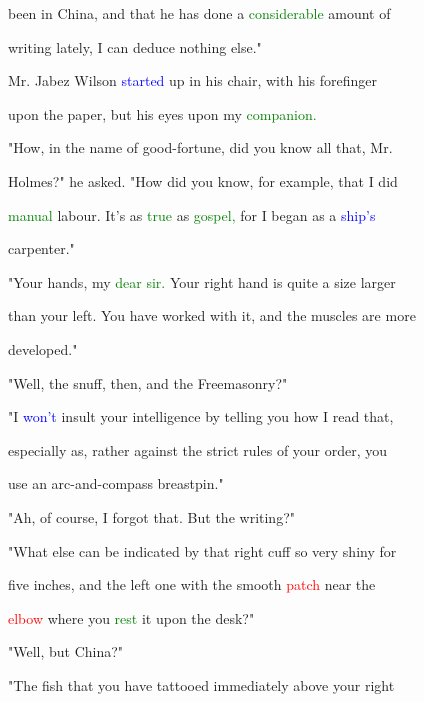  been in China, and that he has done a \textcolor{green}{considerable} amount of

 writing lately, I can deduce nothing else."



 Mr. Jabez Wilson \textcolor{blue}{started} up in his chair, with his forefinger

 upon the paper, but his eyes upon my \textcolor{green}{companion.}



 "How, in the name of good-fortune, did you know all that, Mr.

 Holmes?" he asked. "How did you know, for example, that I did

 \textcolor{green}{manual} labour. It's as \textcolor{green}{true} as \textcolor{green}{gospel,} for I began as a \textcolor{blue}{ship's}

 carpenter."



 "Your hands, my \textcolor{green}{dear} \textcolor{green}{sir.} Your right hand is quite a size larger

 than your left. You have worked with it, and the muscles are more

 developed."



 "Well, the snuff, then, and the Freemasonry?"



 "I \textcolor{blue}{won't} \textcolor{BurntOrange}{insult} your \textcolor{BurntOrange}{intelligence} by telling you how I read that,

 especially as, rather against the strict \textcolor{BurntOrange}{rules} of your order, you

 use an arc-and-compass breastpin."



 "Ah, of course, I forgot that. But the writing?"



 "What else can be indicated by that right cuff so very shiny for

 five inches, and the left one with the smooth \textcolor{red}{patch} near the

 \textcolor{red}{elbow} where you \textcolor{green}{rest} it upon the desk?"



 "Well, but China?"



 "The fish that you have tattooed \textcolor{BurntOrange}{immediately} above your right

